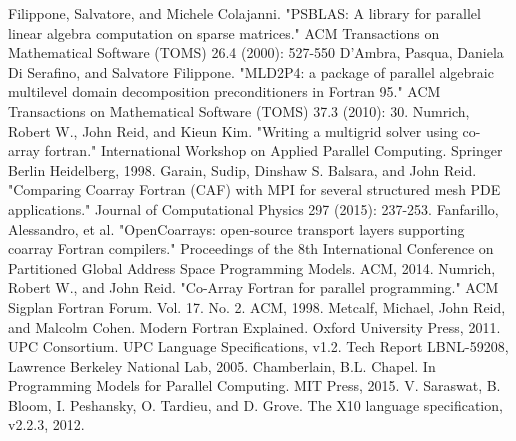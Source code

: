 \documentclass{IOS-Book-Article}
\begin{document}
\begin{thebibliography}{99}
Filippone, Salvatore, and Michele Colajanni. "PSBLAS: A library for parallel linear algebra computation on sparse matrices." ACM Transactions on Mathematical Software (TOMS) 26.4 (2000): 527-550
D’Ambra, Pasqua, Daniela Di Serafino, and Salvatore Filippone. "MLD2P4: a package of parallel algebraic multilevel domain decomposition preconditioners in Fortran 95." ACM Transactions on Mathematical Software (TOMS) 37.3 (2010): 30.
Numrich, Robert W., John Reid, and Kieun Kim. "Writing a multigrid solver using co-array fortran." International Workshop on Applied Parallel Computing. Springer Berlin Heidelberg, 1998.
Garain, Sudip, Dinshaw S. Balsara, and John Reid. "Comparing Coarray Fortran (CAF) with MPI for several structured mesh PDE applications." Journal of Computational Physics 297 (2015): 237-253.
Fanfarillo, Alessandro, et al. "OpenCoarrays: open-source transport layers supporting coarray Fortran compilers." Proceedings of the 8th International Conference on Partitioned Global Address Space Programming Models. ACM, 2014.
Numrich, Robert W., and John Reid. "Co-Array Fortran for parallel programming." ACM Sigplan Fortran Forum. Vol. 17. No. 2. ACM, 1998.
Metcalf, Michael, John Reid, and Malcolm Cohen. Modern Fortran Explained. Oxford University Press, 2011.
UPC Consortium. UPC Language Specifications, v1.2.
Tech Report LBNL-59208, Lawrence Berkeley
National Lab, 2005.
Chamberlain, B.L. Chapel. In Programming Models
for Parallel Computing. MIT Press, 2015.
V. Saraswat, B. Bloom, I. Peshansky, O. Tardieu, and
D. Grove. The X10 language specification, v2.2.3,
2012.

\end{thebibliography}
\end{document}

